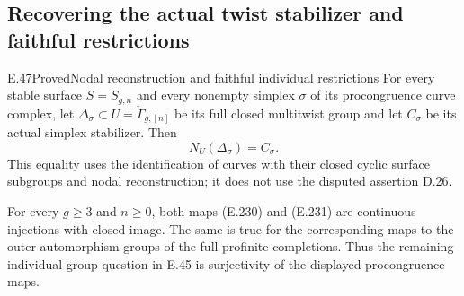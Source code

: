 \subsection{Recovering the actual twist stabilizer and faithful restrictions}

\begin{result}{E.47}{Proved}{Nodal reconstruction and faithful individual restrictions}
For every stable surface $S=S_{g,n}$ and every nonempty simplex
$\sigma$ of its procongruence curve complex, let
$\Delta_\sigma\subset U=\check\Gamma_{g,[n]}$ be its full
closed multitwist group and let $C_\sigma$ be its actual
simplex stabilizer.  Then
\[
 N_U(\Delta_\sigma)=C_\sigma.
                                                               \tag{E.240}
\]
This equality uses the identification of curves with their
closed cyclic surface subgroups and nodal reconstruction;
it does not use the disputed assertion D.26.

For every $g\geq3$ and $n\geq0$, both maps (E.230) and
(E.231) are continuous injections with closed image.
The same is true for the corresponding maps to the outer
automorphism groups of the full profinite completions.
Thus the remaining individual-group question in E.45 is
surjectivity of the displayed procongruence maps.
\end{result}
